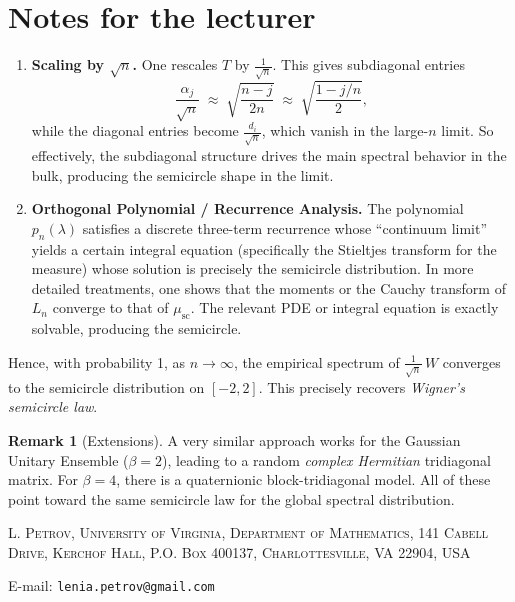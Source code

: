 \documentclass[letterpaper,11pt,oneside,reqno]{article}
\numberwithin{equation}{section}
\theoremstyle{definition}
\newtheorem{remark}[proposition]{Remark}
\newenvironment{lnotes}{\section*{Notes for the lecturer}}{}
\begin{document}
\begin{lnotes}
\begin{enumerate}[1.]
\item \textbf{Scaling by \(\sqrt{n}\).}
   One rescales \(T\) by \(\tfrac{1}{\sqrt{n}}\).  This gives subdiagonal entries
   \[
     \frac{\alpha_j}{\sqrt{n}}
     \;\approx\;
     \sqrt{\frac{n-j}{2n}}
     \;\approx\;
     \sqrt{\frac{1 - j/n}{2}},
   \]
   while the diagonal entries become \(\tfrac{d_i}{\sqrt{n}}\), which vanish in the large-\(n\) limit.  So effectively, the subdiagonal structure drives the main spectral behavior in the bulk, producing the semicircle shape in the limit.

\item \textbf{Orthogonal Polynomial / Recurrence Analysis.}
   The polynomial \(p_n(\lambda)\) satisfies a discrete three-term recurrence whose ``continuum limit'' yields a certain integral equation (specifically the Stieltjes transform for the measure) whose solution is precisely the semicircle distribution.  In more detailed treatments, one shows that the moments or the Cauchy transform of \(L_n\) converge to that of \(\mu_{\mathrm{sc}}\).  The relevant PDE or integral equation is exactly solvable, producing the semicircle.

\end{enumerate}

Hence, with probability 1, as \(n\to\infty\), the empirical spectrum of \(\tfrac{1}{\sqrt{n}}\,W\) converges to the semicircle distribution on \([-2,2]\).  This precisely recovers \emph{Wigner’s semicircle law}.

\begin{remark}[Extensions]
A very similar approach works for the Gaussian Unitary Ensemble (\(\beta=2\)), leading to a random \emph{complex Hermitian} tridiagonal matrix.  For \(\beta=4\), there is a quaternionic block-tridiagonal model.  All of these point toward the same semicircle law for the global spectral distribution.
\end{remark}


\end{lnotes}







\medskip

\textsc{L. Petrov, University of Virginia, Department of Mathematics, 141 Cabell Drive, Kerchof Hall, P.O. Box 400137, Charlottesville, VA 22904, USA}

E-mail: \texttt{lenia.petrov@gmail.com}
\end{document}
